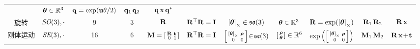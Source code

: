 \begin{table*}[tb]
\begin{center}
\begin{tabular}{|c|c|c|c|c|c|c|c|c|c|c|}
  & ${{\bm \theta}}\in{\mathbb R}^3$  
  & ${\bf q}=\exp({\bf u}\theta/2)$ 
  & ${\bf q}_1\,{\bf q}_2$
  & ${\bf q}\,{\bf x}\,{\bf q}^*$ 
  \\
旋转   & $\textit{SO}(3),\cdot$ & 9    & 3   
  & ${\bf R}$ 
  & ${\bf R}^{\top}{\bf R}={\bf I}$
  & $\left[{{\bm \theta}}\right]_\times\in{\mathfrak {so}}(3)$     
  & ${{\bm \theta}}\in{\mathbb R}^3$  
  & ${\bf R}=\exp(\left[{{\bm \theta}}\right]_\times)$ 
  & ${\bf R}_1\,{\bf R}_2$
  & ${\bf R}\,{\bf x}$
  \\
刚体运动  & $\textit{SE}(3),\cdot$   & 16   & 6 
  & ${\bf M}=\begin{bsmallmatrix}{\bf R} & {\bf t} \\ 0 & 1\end{bsmallmatrix}$ 
  & ${\bf R}^{\top}{\bf R}={\bf I}$
  & $\begin{bsmallmatrix}\left[{{\bm \theta}}\right]_\times & {\bm \rho} \\ 0 & 0\end{bsmallmatrix} \!\in\!{\mathfrak {se}}(3)$     
  & $\begin{bsmallmatrix}{\bm \rho}\\{{\bm \theta}}\end{bsmallmatrix}\in{\mathbb R}^6$  
  & $\exp\left(\begin{bsmallmatrix}\left[{{\bm \theta}}\right]_\times & {\bm \rho} \\ 0 & 0\end{bsmallmatrix}\right)$ 
  & ${\bf M}_1\,{\bf M}_2$
  & ${\bf R}\,{\bf x}\!+\!{\bf t}$
  \\
\bottomrule
\end{tabular}
\end{center}
\end{table*}%

